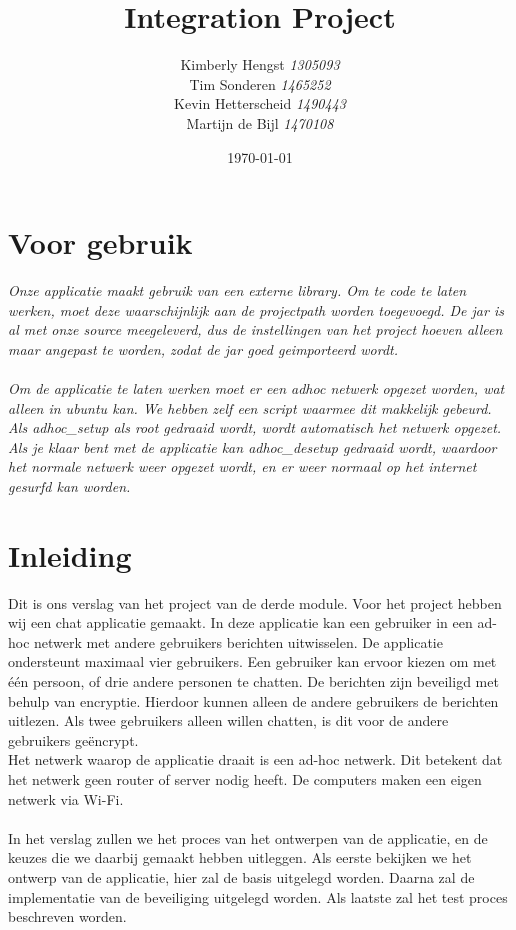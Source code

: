 \documentclass{article}
\title{Integration Project}
\author{Kimberly Hengst \emph{1305093}\\ Tim Sonderen \emph{1465252}\\ Kevin Hetterscheid \emph{1490443}\\ Martijn de Bijl \emph{1470108}}
\date{\today}
\begin{document}
\maketitle

\newpage

\section*{Voor gebruik}
\emph{Onze applicatie maakt gebruik van een externe library. Om te code te laten werken, moet deze waarschijnlijk aan de projectpath worden toegevoegd. De jar is al met onze source meegeleverd, dus de instellingen van het project hoeven alleen maar angepast te worden, zodat de jar goed geimporteerd wordt.\\
\phantom{YOLO} \\
Om de applicatie te laten werken moet er een adhoc netwerk opgezet worden, wat alleen in ubuntu kan. We hebben zelf een script waarmee dit makkelijk gebeurd. Als adhoc\_setup als root gedraaid wordt, wordt automatisch het netwerk opgezet. Als je klaar bent met de applicatie kan adhoc\_desetup gedraaid wordt, waardoor het normale netwerk weer opgezet wordt, en er weer normaal op het internet gesurfd kan worden.}

\newpage

\tableofcontents

\section{Inleiding}
Dit is ons verslag van het project van de derde module. Voor het project hebben wij een chat applicatie gemaakt. In deze applicatie kan een gebruiker in een ad-hoc netwerk met andere gebruikers berichten uitwisselen. De applicatie ondersteunt maximaal vier gebruikers. Een gebruiker kan ervoor kiezen om met \'{e}\'{e}n persoon, of drie andere personen te chatten. De berichten zijn beveiligd met behulp van encryptie. Hierdoor kunnen alleen de andere gebruikers de berichten uitlezen. Als twee gebruikers alleen willen chatten, is dit voor de andere gebruikers ge\"{e}ncrypt.\\
Het netwerk waarop de applicatie draait is een ad-hoc netwerk. Dit betekent dat het netwerk geen router of server nodig heeft. De computers  maken een eigen netwerk via Wi-Fi.
\\
\phantom{YOLO} \\
In het verslag zullen we het proces van het ontwerpen van de applicatie, en de keuzes die we daarbij gemaakt hebben uitleggen. Als eerste bekijken we het ontwerp van de applicatie, hier zal de basis uitgelegd worden. Daarna zal de implementatie van de beveiliging uitgelegd worden. Als laatste zal het test proces beschreven worden.
\end{document}
